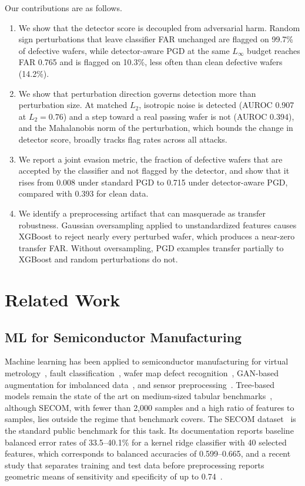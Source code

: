 \documentclass[preprint,12pt,authoryear]{elsarticle}
\begin{document}
Our contributions are as follows.
\begin{enumerate}
\item We show that the detector score is decoupled from adversarial harm. Random sign perturbations that leave classifier FAR unchanged are flagged on 99.7\% of defective wafers, while detector-aware PGD at the same $L_\infty$ budget reaches FAR 0.765 and is flagged on 10.3\%, less often than clean defective wafers (14.2\%).
\item We show that perturbation direction governs detection more than perturbation size. At matched $L_2$, isotropic noise is detected (AUROC 0.907 at $L_2=0.76$) and a step toward a real passing wafer is not (AUROC 0.394), and the Mahalanobis norm of the perturbation, which bounds the change in detector score, broadly tracks flag rates across all attacks.
\item We report a joint evasion metric, the fraction of defective wafers that are accepted by the classifier and not flagged by the detector, and show that it rises from 0.008 under standard PGD to 0.715 under detector-aware PGD, compared with 0.393 for clean data.
\item We identify a preprocessing artifact that can masquerade as transfer robustness. Gaussian oversampling applied to unstandardized features causes XGBoost to reject nearly every perturbed wafer, which produces a near-zero transfer FAR. Without oversampling, PGD examples transfer partially to XGBoost and random perturbations do not.
\end{enumerate}

\section{Related Work}
\label{sec:related}

\subsection{ML for Semiconductor Manufacturing}
Machine learning has been applied to semiconductor manufacturing for virtual metrology~\citep{maitra2024,dreyfus2022}, fault classification~\citep{lee2017fdc}, wafer map defect recognition~\citep{nakazawa2018}, GAN-based augmentation for imbalanced data~\citep{fan2025gan}, and sensor preprocessing~\citep{park2024}. Tree-based models remain the state of the art on medium-sized tabular benchmarks~\citep{grinsztajn2022}, although SECOM, with fewer than 2,000 samples and a high ratio of features to samples, lies outside the regime that benchmark covers. The SECOM dataset~\citep{secom2008} is the standard public benchmark for this task. Its documentation reports baseline balanced error rates of 33.5--40.1\% for a kernel ridge classifier with 40 selected features, which corresponds to balanced accuracies of 0.599--0.665, and a recent study that separates training and test data before preprocessing reports geometric means of sensitivity and specificity of up to 0.74~\citep{park2024}.
\end{document}
